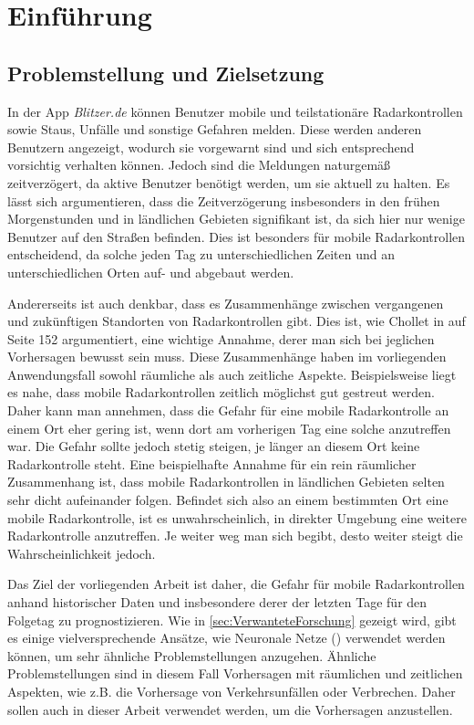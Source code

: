 \section{Einführung}
\label{sec:Einführung}

\subsection{Problemstellung und Zielsetzung}
\label{sec:Problemstellung}
In der App \emph{Blitzer.de} können Benutzer mobile und teilstationäre Radarkontrollen sowie Staus, Unfälle und sonstige Gefahren melden.
Diese werden anderen Benutzern angezeigt, wodurch sie vorgewarnt sind und sich entsprechend vorsichtig verhalten können.
Jedoch sind die Meldungen naturgemäß zeitverzögert, da aktive Benutzer benötigt werden, um sie aktuell zu halten.
Es lässt sich argumentieren, dass die Zeitverzögerung insbesonders in den frühen Morgenstunden und in ländlichen Gebieten signifikant ist,
da sich hier nur wenige Benutzer auf den Straßen befinden.
Dies ist besonders für mobile Radarkontrollen entscheidend, da solche jeden Tag zu unterschiedlichen Zeiten und an unterschiedlichen Orten auf- und abgebaut werden.

Andererseits ist auch denkbar, dass es Zusammenhänge zwischen vergangenen und zukünftigen Standorten von Radarkontrollen gibt.
Dies ist, wie Chollet in \cite{DeepLearningPythonKeras} auf Seite 152 argumentiert, eine wichtige Annahme, derer man sich bei jeglichen Vorhersagen bewusst sein muss.
Diese Zusammenhänge haben im vorliegenden Anwendungsfall sowohl räumliche als auch zeitliche Aspekte.
Beispielsweise liegt es nahe, dass mobile Radarkontrollen zeitlich möglichst gut gestreut werden.
Daher kann man annehmen, dass die Gefahr für eine mobile Radarkontrolle an einem Ort eher gering ist, wenn dort am vorherigen Tag eine solche anzutreffen war.
Die Gefahr sollte jedoch stetig steigen, je länger an diesem Ort keine Radarkontrolle steht.
Eine beispielhafte Annahme für ein rein räumlicher Zusammenhang ist, dass mobile Radarkontrollen in ländlichen Gebieten selten sehr dicht aufeinander folgen.
Befindet sich also an einem bestimmten Ort eine mobile Radarkontrolle, ist es unwahrscheinlich, in direkter Umgebung eine weitere Radarkontrolle anzutreffen.
Je weiter weg man sich begibt, desto weiter steigt die Wahrscheinlichkeit jedoch.

Das Ziel der vorliegenden Arbeit ist daher, die Gefahr für mobile Radarkontrollen anhand historischer Daten und insbesondere derer der letzten Tage für den Folgetag zu prognostizieren.
Wie in \autoref{sec:VerwanteteForschung} gezeigt wird, gibt es einige vielversprechende Ansätze, wie Neuronale Netze () verwendet werden können, um sehr ähnliche Problemstellungen anzugehen.
Ähnliche Problemstellungen sind in diesem Fall Vorhersagen mit räumlichen und zeitlichen Aspekten, wie z.B. die Vorhersage von Verkehrsunfällen oder Verbrechen.
Daher sollen auch in dieser Arbeit  verwendet werden, um die Vorhersagen anzustellen.

